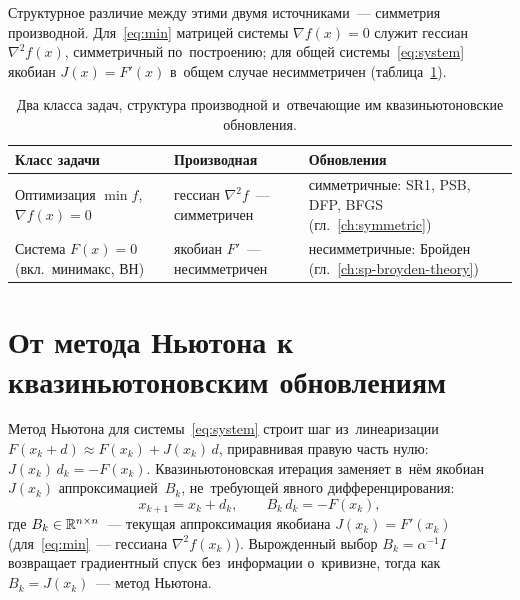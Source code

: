 Структурное различие между этими двумя источниками~--- симметрия
производной. Для~\eqref{eq:min} матрицей системы $\nabla f(x)=0$ служит
гессиан $\nabla^2 f(x)$, симметричный по~построению; для общей
системы~\eqref{eq:system} якобиан $J(x)=F'(x)$ в~общем случае
несимметричен (таблица~\ref{tab:ch1_classes}).

\begin{table}[ht]
\centering
\caption{Два класса задач, структура производной и~отвечающие им
квазиньютоновские обновления.}\label{tab:ch1_classes}
\renewcommand{\arraystretch}{1.3}
\begin{tabular}{@{}p{4.4cm} p{3.9cm} p{4.4cm}@{}}
\toprule
Класс задачи & Производная & Обновления \\
\midrule
Оптимизация $\min f$,\newline $\nabla f(x)=0$
  & гессиан $\nabla^2 f$~--- симметричен
  & симметричные: SR1, PSB, DFP, BFGS (гл.~\ref{ch:symmetric}) \\
Система $F(x)=0$\newline (вкл.\ минимакс, ВН)
  & якобиан $F'$~--- несимметричен
  & несимметричные: Бройден (гл.~\ref{ch:sp-broyden-theory}) \\
\bottomrule
\end{tabular}
\end{table}


\section{От метода Ньютона к квазиньютоновским обновлениям}\label{sec:ch1_newton}

Метод Ньютона для системы~\eqref{eq:system} строит шаг из~линеаризации
$F(x_k+d)\approx F(x_k)+J(x_k)\,d$, приравнивая правую часть нулю:
$J(x_k)\,d_k=-F(x_k)$. Квазиньютоновская итерация заменяет в~нём
якобиан~$J(x_k)$ аппроксимацией~$B_k$, не~требующей явного
дифференцирования:
\begin{equation}\label{eq:step}
  x_{k+1} = x_k + d_k, \qquad B_k\,d_k = -F(x_k),
\end{equation}
где $B_k \in \mathbb{R}^{n \times n}$~--- текущая аппроксимация якобиана
$J(x_k) = F'(x_k)$ (для~\eqref{eq:min}~--- гессиана $\nabla^2 f(x_k)$). Вырожденный
выбор $B_k=\alpha^{-1}I$ возвращает градиентный спуск без~информации
о~кривизне, тогда как $B_k=J(x_k)$~--- метод Ньютона.


